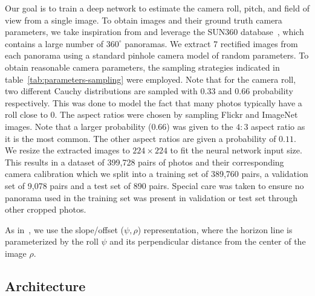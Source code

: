 Our goal is to train a deep network to estimate the camera roll, pitch, and field of view from a single image. To obtain images and their ground truth camera parameters, we take inspiration from \cite{Workman2016,Hold-Geoffroy2017} and leverage the SUN360 database~\cite{Xiao2012}, which contains a large number of $360^\circ$ panoramas. We extract 7 rectified images from each panorama using a standard pinhole camera model of random parameters. To obtain reasonable camera parameters, the sampling strategies indicated in table~\ref{tab:parameters-sampling} were employed. Note that for the camera roll, two different Cauchy distributions are sampled with 0.33 and 0.66 probability respectively. This was done to model the fact that many photos typically have a roll close to 0. The aspect ratios were chosen by sampling Flickr and ImageNet images. Note that a larger probability (0.66) was given to the $4{:}3$ aspect ratio as it is the most common. The other aspect ratios are given a probability of $0.11$. We resize the extracted images to $224\times224$ to fit the neural network input size. This results in a dataset of 399,728 pairs of photos and their corresponding camera calibration which we split into a training set of 389,760 pairs, a validation set of 9,078 pairs and a test set of 890 pairs. Special care was taken to ensure no panorama used in the training set was present in validation or test set through other cropped photos.

As in~\cite{Workman2016}, we use the slope/offset ($\psi,\rho$) representation, where the horizon line is parameterized by the roll $\psi$ and its perpendicular distance from the center of the image $\rho$.

\subsection{Architecture}

